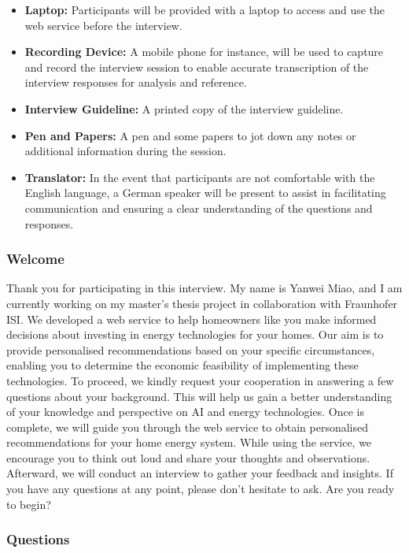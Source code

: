 \begin{itemize}
  \item \textbf{Laptop:} Participants will be provided with a laptop to access and use the web service before the interview. 
  \item \textbf{Recording Device:} A mobile phone for instance, will be used to capture and record the interview session to enable accurate transcription of the interview responses for analysis and reference.
  \item \textbf{Interview Guideline:} A printed copy of the interview guideline.
  \item \textbf{Pen and Papers:} A pen and some papers to jot down any notes or additional information during the session. 
  \item \textbf{Translator:} In the event that participants are not comfortable with the English language, a German speaker will be present to assist in facilitating communication and ensuring a clear understanding of the questions and responses.
\end{itemize}


\subsubsection{Welcome}

Thank you for participating in this interview. 
My name is Yanwei Miao, and I am currently working on my master's thesis project in collaboration with Fraunhofer ISI.
We developed a web service to help homeowners like you make informed decisions about investing in energy technologies for your homes. 
Our aim is to provide personalised recommendations based on your specific circumstances, enabling you to determine the economic feasibility of implementing these technologies. 
To proceed, we kindly request your cooperation in answering a few questions about your background. 
This will help us gain a better understanding of your knowledge and perspective on AI and energy technologies. 
Once is complete, we will guide you through the web service to obtain personalised recommendations for your home energy system. 
While using the service, we encourage you to think out loud and share your thoughts and observations. 
Afterward, we will conduct an interview to gather your feedback and insights. 
If you have any questions at any point, please don't hesitate to ask. 
Are you ready to begin?


\subsubsection{Questions}

